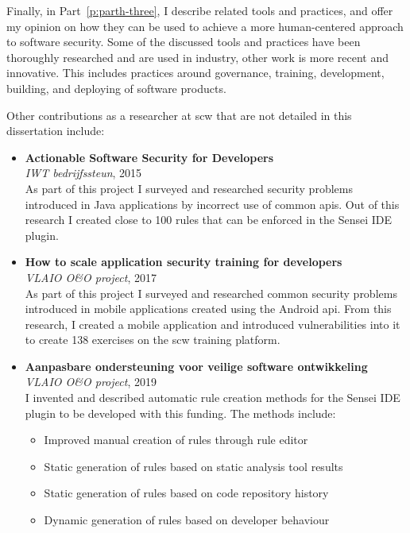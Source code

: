 Finally, in Part~\ref{p:parth-three}, I describe related tools and practices, and offer my opinion on how they can be used to achieve a more human-centered approach to software security.
Some of the discussed tools and practices have been thoroughly researched and are used in industry, other work is more recent and innovative. 
This includes practices around governance, training, development, building, and deploying of software products.

Other contributions as a researcher at 
\gls{scw} that are not detailed in this dissertation include:

\begin{itemize}
    \item
    \textbf{Actionable Software Security for Developers}\\
    \emph{IWT bedrijfssteun}, 2015\\
    As part of this project I surveyed and researched security problems introduced in Java applications by incorrect use of common \glspl{api}.
    Out of this research I created close to 100 rules that can be enforced in the Sensei IDE plugin. 
    
    \item 
    \textbf{How to scale application security training for developers}\\
    \emph{VLAIO O\&O project}, 2017\\
    As part of this project I surveyed and researched common security problems introduced in mobile applications created using the Android \gls{api}.
    From this research, I created a mobile application and introduced vulnerabilities into it to create 138 exercises on the \gls{scw} training platform.
    
    \item
    \textbf{Aanpasbare ondersteuning voor veilige software ontwikkeling}\\
    \emph{VLAIO O\&O project}, 2019\\
    I invented and described automatic rule creation methods for the Sensei IDE plugin to be developed with this funding. The methods include:
    \begin{itemize}
        \item Improved manual creation of rules through rule editor
        \item Static generation of rules based on static analysis tool results
        \item Static generation of rules based on code repository history
        \item Dynamic generation of rules based on developer behaviour
    \end{itemize}
    

\end{itemize}
